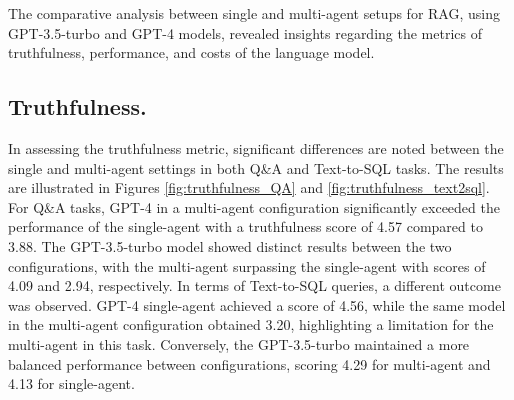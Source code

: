         The comparative analysis between single and multi-agent setups for RAG, using GPT-3.5-turbo and GPT-4 models, revealed insights regarding the metrics of truthfulness, performance, and costs of the language model.

        
        \subsection{Truthfulness.} 
            In assessing the truthfulness metric, significant differences are noted between the single and multi-agent settings in both Q\&A and Text-to-SQL tasks. The results are illustrated in Figures \ref{fig:truthfulness_QA} and \ref{fig:truthfulness_text2sql}.
            For Q\&A tasks, GPT-4 in a multi-agent configuration significantly exceeded the performance of the single-agent with a truthfulness score of 4.57 compared to 3.88. The GPT-3.5-turbo model showed distinct results between the two configurations, with the multi-agent surpassing the single-agent with scores of 4.09 and 2.94, respectively.
            In terms of Text-to-SQL queries, a different outcome was observed. GPT-4 single-agent achieved a score of 4.56, while the same model in the multi-agent configuration obtained 3.20, highlighting a limitation for the multi-agent in this task. Conversely, the GPT-3.5-turbo maintained a more balanced performance between configurations, scoring 4.29 for multi-agent and 4.13 for single-agent.
            
            
            
